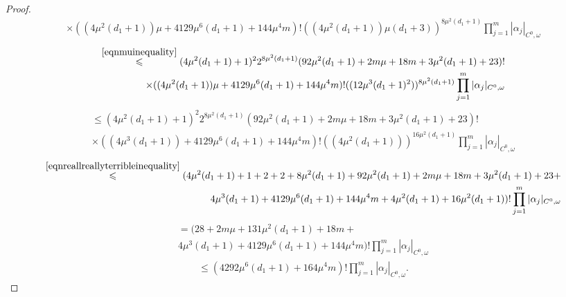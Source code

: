 \documentclass[10pt,a4paper]{amsart}
\renewcommand{\leq}{\leqslant}
\begin{document}
\begin{proof}
\begin{equation}
\begin{aligned}
			\times ((4\mu^2(d_1+1))\mu+ 4129\mu^6(d_1+1) + 144\mu^4m)! ((4\mu^2(d_1+1))\mu(d_1+3))^{8\mu^2(d_1+1)}
			\prod_{j=1}^m |\alpha_j|_{C^0,\omega}
		\end{aligned}
	\end{equation}
	\begin{equation}
		\begin{aligned}
			\overset{\textnormal{\eqref{eqnmuinequality}}}{\leq}
			(4\mu^2(d_1+1)+1)^2 2^{8\mu^2(d_1+1)} (92\mu^2(d_1+1) + 2m\mu + 18m + 3\mu^2(d_1+1) +23)! \\
			\times ((4\mu^2(d_1+1))\mu+ 4129\mu^6(d_1+1) + 144\mu^4m)! ((12\mu^3(d_1+1)^2))^{8\mu^2(d_1+1)}
			\prod_{j=1}^m |\alpha_j|_{C^0,\omega}
		\end{aligned}
	\end{equation}
	\begin{equation}
		\begin{aligned}
			\leq
			(4\mu^2(d_1+1)+1)^2 2^{8\mu^2(d_1+1)} (92\mu^2(d_1+1) + 2m\mu + 18m + 3\mu^2(d_1+1) +23)! \\
			\times ((4\mu^3(d_1+1))+ 4129\mu^6(d_1+1) + 144\mu^4m)! ((4\mu^2(d_1+1)))^{16\mu^2(d_1+1)}
			\prod_{j=1}^m |\alpha_j|_{C^0,\omega}
		\end{aligned}
	\end{equation}
	\begin{equation}
		\begin{aligned}
			\overset{\textnormal{\eqref{eqnreallreallyterribleinequality}}}{\leq}
			(4\mu^2(d_1+1)+1+2+2+8\mu^2(d_1+1)+92\mu^2(d_1+1) + 2m\mu + 18m + 3\mu^2(d_1+1) + 23 + \\
			4\mu^3(d_1+1)+ 4129\mu^6(d_1+1) + 144\mu^4m + 4\mu^2(d_1+1)+16\mu^2(d_1+1))!
			\prod_{j=1}^m |\alpha_j|_{C^0,\omega}
		\end{aligned}
	\end{equation}
	\begin{equation}
		\begin{aligned}
			=
			(28+2m\mu+131\mu^2(d_1+1)+ 18m + \\
			4\mu^3(d_1+1)+ 4129\mu^6(d_1+1) + 144\mu^4m)!
			\prod_{j=1}^m |\alpha_j|_{C^0,\omega}
		\end{aligned}
	\end{equation}
	\begin{equation}
		\begin{aligned}
			\leq
			(4292\mu^6(d_1+1)+ 164\mu^4m)!
			\prod_{j=1}^m |\alpha_j|_{C^0,\omega}.
		\end{aligned}
	\end{equation}


\end{proof}
\end{document}
